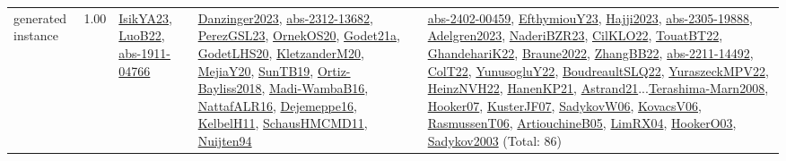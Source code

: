 {\begin{longtable}{p{3cm}r>{\raggedright\arraybackslash}p{6cm}>{\raggedright\arraybackslash}p{6cm}>{\raggedright\arraybackslash}p{8cm}}
\index{generated instance}\index{Benchmarks!generated instance}generated instance &  1.00 & \hyperref[detail:IsikYA23]{IsikYA23}, \hyperref[detail:LuoB22]{LuoB22}, \hyperref[detail:abs-1911-04766]{abs-1911-04766} & \hyperref[detail:Danzinger2023]{Danzinger2023}, \hyperref[detail:abs-2312-13682]{abs-2312-13682}, \hyperref[detail:PerezGSL23]{PerezGSL23}, \hyperref[detail:OrnekOS20]{OrnekOS20}, \hyperref[detail:Godet21a]{Godet21a}, \hyperref[detail:GodetLHS20]{GodetLHS20}, \hyperref[detail:KletzanderM20]{KletzanderM20}, \hyperref[detail:MejiaY20]{MejiaY20}, \hyperref[detail:SunTB19]{SunTB19}, \hyperref[detail:Ortiz-Bayliss2018]{Ortiz-Bayliss2018}, \hyperref[detail:Madi-WambaB16]{Madi-WambaB16}, \hyperref[detail:NattafALR16]{NattafALR16}, \hyperref[detail:Dejemeppe16]{Dejemeppe16}, \hyperref[detail:KelbelH11]{KelbelH11}, \hyperref[detail:SchausHMCMD11]{SchausHMCMD11}, \hyperref[detail:Nuijten94]{Nuijten94} & \hyperref[detail:abs-2402-00459]{abs-2402-00459}, \hyperref[detail:EfthymiouY23]{EfthymiouY23}, \hyperref[detail:Hajji2023]{Hajji2023}, \hyperref[detail:abs-2305-19888]{abs-2305-19888}, \hyperref[detail:Adelgren2023]{Adelgren2023}, \hyperref[detail:NaderiBZR23]{NaderiBZR23}, \hyperref[detail:CilKLO22]{CilKLO22}, \hyperref[detail:TouatBT22]{TouatBT22}, \hyperref[detail:GhandehariK22]{GhandehariK22}, \hyperref[detail:Braune2022]{Braune2022}, \hyperref[detail:ZhangBB22]{ZhangBB22}, \hyperref[detail:abs-2211-14492]{abs-2211-14492}, \hyperref[detail:ColT22]{ColT22}, \hyperref[detail:YunusogluY22]{YunusogluY22}, \hyperref[detail:BoudreaultSLQ22]{BoudreaultSLQ22}, \hyperref[detail:YuraszeckMPV22]{YuraszeckMPV22}, \hyperref[detail:HeinzNVH22]{HeinzNVH22}, \hyperref[detail:HanenKP21]{HanenKP21}, \hyperref[detail:Astrand21]{Astrand21}...\hyperref[detail:Terashima-Marn2008]{Terashima-Marn2008}, \hyperref[detail:Hooker07]{Hooker07}, \hyperref[detail:KusterJF07]{KusterJF07}, \hyperref[detail:SadykovW06]{SadykovW06}, \hyperref[detail:KovacsV06]{KovacsV06}, \hyperref[detail:RasmussenT06]{RasmussenT06}, \hyperref[detail:ArtiouchineB05]{ArtiouchineB05}, \hyperref[detail:LimRX04]{LimRX04}, \hyperref[detail:HookerO03]{HookerO03}, \hyperref[detail:Sadykov2003]{Sadykov2003} (Total: 86)\\

\end{longtable}}
